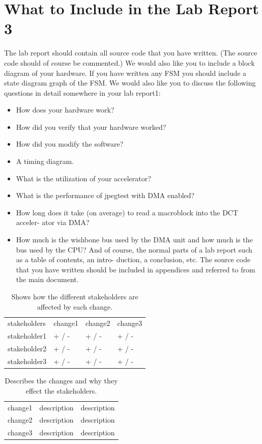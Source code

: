 \documentclass[a4paper]{article}
\begin{document}
\section{What to Include in the Lab Report 3}
The lab report should contain all source code that you have written. (The source code should of course be commented.) We would also like you to include a block diagram of your hardware. If you have written any FSM you should include a state diagram graph of the FSM.
We would also like you to discuss the following questions in detail somewhere in your lab report1:
\begin{itemize}
\item How does your hardware work?
\item How did you verify that your hardware worked?
\item How did you modify the software?
\item A timing diagram.
\item What is the utilization of your accelerator?
\item What is the performance of jpegtest with DMA enabled?
\item How long does it take (on average) to read a macroblock into the DCT acceler- ator via DMA?
\item How much is the wishbone bus used by the DMA unit and how much is the bus used by the CPU?
And of course, the normal parts of a lab report such as a table of contents, an intro- duction, a conclusion, etc. The source code that you have written should be included in appendices and referred to from the main document.
\end{itemize}


\begin{table}[ht]
	\centering
 	\begin{tabular}{l l l l}
		stakeholders 			& change1 	& change2  	& change3 \\
		stakeholder1 			& + / -		& + / -		& + / - \\
		stakeholder2 			& + / -		& + / -		& + / - \\
		stakeholder3 			& + / -		& + / -		& + / - \\
	\end{tabular}
	
	\caption{Shows how the different stakeholders are affected by each change.}
	\label{tab:table1}
\end{table}

\begin{table}[ht]
	\centering
 	\begin{tabular}{l l l}
	    change1 & description & description \\
	    change2 & description & description \\
	    change3 & description & description \\
	\end{tabular}
	
	\caption{Describes the changes and why they effect the stakeholders.}
	\label{tab:table2}
\end{table}
\end{document}
